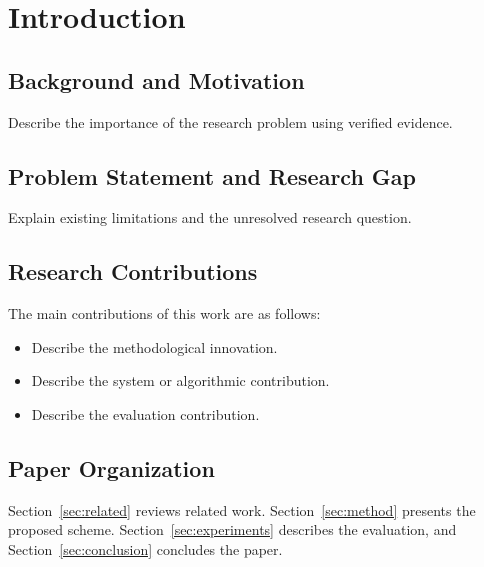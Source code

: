 \section{Introduction}\label{sec:intro}
\subsection{Background and Motivation}
Describe the importance of the research problem using verified evidence.
\subsection{Problem Statement and Research Gap}
Explain existing limitations and the unresolved research question.
\subsection{Research Contributions}
The main contributions of this work are as follows:
\begin{itemize}
\item Describe the methodological innovation.
\item Describe the system or algorithmic contribution.
\item Describe the evaluation contribution.
\end{itemize}
\subsection{Paper Organization}
Section~\ref{sec:related} reviews related work. Section~\ref{sec:method} presents the proposed scheme. Section~\ref{sec:experiments} describes the evaluation, and Section~\ref{sec:conclusion} concludes the paper.
